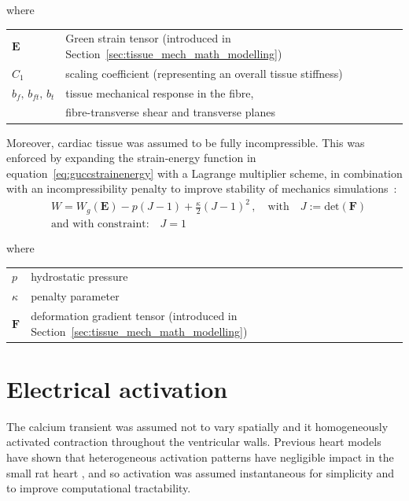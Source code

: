 \noindent
where

\vspace{0.2cm}
\begin{tabular}{ll}
    $\mathbf{E}$ & Green strain tensor (introduced in Section~\ref{sec:tissue_mech_math_modelling}) \\
    $C_1$ & scaling coefficient (representing an overall tissue stiffness) \\
    $b_f,\,b_{ft},\,b_t$ & tissue mechanical response in the fibre, \\ & fibre-transverse shear and transverse planes \\
\end{tabular}

\vspace{0.3cm}\noindent
Moreover, cardiac tissue was assumed to be fully incompressible. This was enforced by expanding the strain-energy function in equation~\eqref{eq:guccstrainenergy} with a Lagrange multiplier scheme, in combination with an incompressibility penalty to improve stability of mechanics simulations~\cite{Land:2012*a, Land:2015*b}:
%
\begin{align}\label{eq:landstrainenergy}
    &W = W_g(\mathbf{E}) - p(J - 1) + \frac{\kappa}{2}(J - 1)^2\,,\quad\text{with}\quad J:=\text{det}(\mathbf{F}) \\
    &\text{and with constraint:}\quad J=1
\end{align}

\noindent
where

\vspace{0.2cm}
\begin{tabular}{ll}
    $p$ & hydrostatic pressure \\
    $\kappa$ & penalty parameter \\
    $\mathbf{F}$ & deformation gradient tensor (introduced in Section~\ref{sec:tissue_mech_math_modelling})
\end{tabular}


%
%
%
\section{Electrical activation}\label{sec:ch2electricalactivation}
The calcium transient was assumed not to vary spatially and it homogeneously activated contraction throughout the ventricular walls. Previous heart models
have shown that heterogeneous activation patterns have negligible impact in the small rat heart , and so activation was assumed instantaneous for simplicity and to improve computational tractability.


